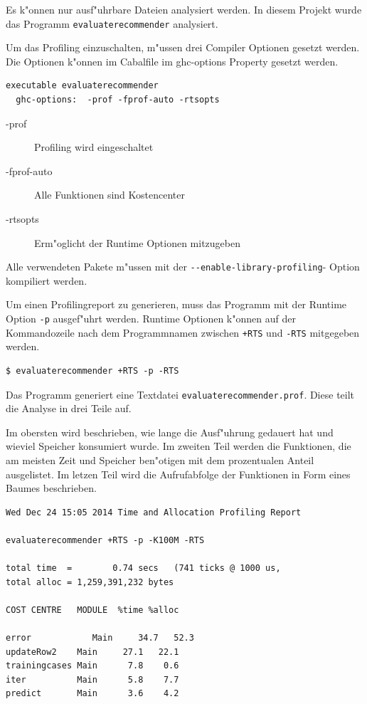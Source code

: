 \documentclass[a4paper, 12pt]{article}
\begin{document}
Es k"onnen nur ausf"uhrbare Dateien analysiert werden. In diesem Projekt wurde das Programm \verb|evaluaterecommender| analysiert.

Um das Profiling einzuschalten, m"ussen drei Compiler Optionen gesetzt werden. Die Optionen k"onnen im Cabalfile im ghc-options Property gesetzt werden.
\begin{verbatim}
executable evaluaterecommender
  ghc-options:	-prof -fprof-auto -rtsopts
\end{verbatim}
\begin{description}
\item[-prof] Profiling wird eingeschaltet
\item[-fprof-auto] Alle Funktionen sind Kostencenter
\item[-rtsopts] Erm"oglicht der Runtime Optionen mitzugeben
\end{description}

Alle verwendeten Pakete m"ussen mit der \verb|--enable-library-profiling|- Option kompiliert werden.

Um einen Profilingreport zu generieren, muss das Programm mit der Runtime Option \verb|-p| ausgef"uhrt werden. Runtime Optionen k"onnen auf der Kommandozeile nach dem Programmnamen zwischen \verb|+RTS| und \verb|-RTS| mitgegeben werden.  

\begin{verbatim}
$ evaluaterecommender +RTS -p -RTS
\end{verbatim}

Das Programm generiert eine Textdatei \verb|evaluaterecommender.prof|. Diese teilt die Analyse in drei Teile auf.

Im obersten wird beschrieben, wie lange die Ausf"uhrung gedauert hat und wieviel Speicher konsumiert wurde. Im zweiten Teil werden die Funktionen, die am meisten Zeit und Speicher ben"otigen mit dem prozentualen Anteil ausgelistet. Im letzen Teil wird die Aufrufabfolge der Funktionen in Form eines Baumes beschrieben.

\begin{verbatim}
Wed Dec 24 15:05 2014 Time and Allocation Profiling Report 

evaluaterecommender +RTS -p -K100M -RTS

total time  =        0.74 secs   (741 ticks @ 1000 us,
total alloc = 1,259,391,232 bytes 

COST CENTRE   MODULE  %time %alloc

error            Main     34.7   52.3
updateRow2    Main     27.1   22.1
trainingcases Main      7.8    0.6
iter          Main      5.8    7.7
predict       Main      3.6    4.2

\end{verbatim}
\end{document}

